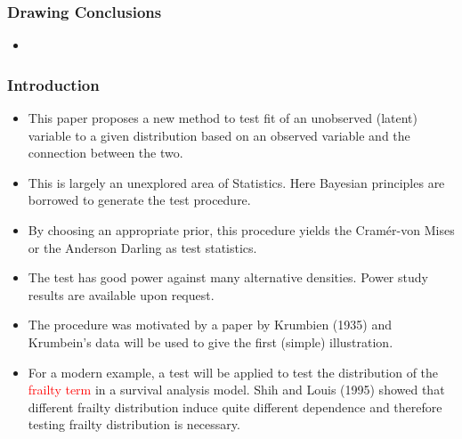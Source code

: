 \documentclass{beamer}
\newcommand{\cram}{Cram\'{e}r-von Mises }
\begin{document}
\frame
{
  \frametitle{Drawing Conclusions}

\begin{itemize}
\item

  
\end{itemize} 

}
















\frame
{
  \frametitle{Introduction}

\begin{itemize}
\item
This paper proposes a new method to test fit of an unobserved (latent) variable 
to a given distribution based on an observed variable and the connection between the two. 
\item
This is largely an unexplored area of Statistics. Here Bayesian 
principles are borrowed to generate the test procedure. 
\item
By choosing an appropriate prior, this procedure yields the \cram 
 or the Anderson Darling  as test statistics. 

\item 
The test has good power against many alternative                                    
densities. Power study results are available upon request.

\item
The procedure was motivated by a paper by Krumbien (1935) and Krumbein's data will be used to give the first (simple) illustration. 

\item 
For a modern example, a test will be applied to test the distribution of the \textcolor{red} {frailty term}
 in a survival analysis  model. Shih and Louis (1995) showed that different frailty distribution induce quite different dependence and therefore 
testing frailty distribution is necessary.
  
\end{itemize} 

}
\end{document}
